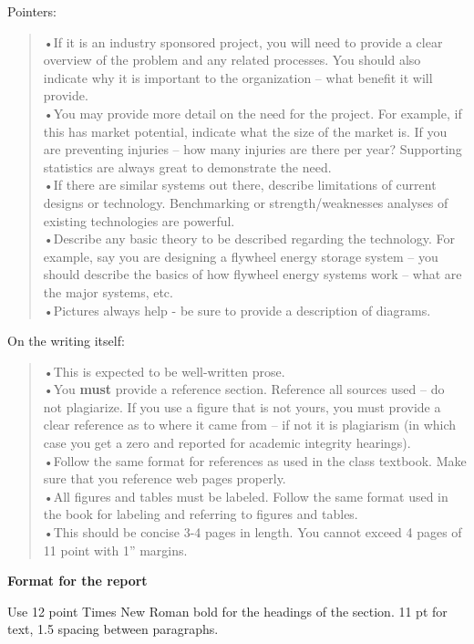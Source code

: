 \begin{enumerate}
\begin{onlysolution}
Pointers:
\begin{quote}
•If it is an industry sponsored project, you will need to provide a
clear overview of the problem and any related processes. You should also
indicate why it is important to the organization -- what benefit it will
provide.\\
•You may provide more detail on the need for the project. For example,
if this has market potential, indicate what the size of the market is.
If you are preventing injuries -- how many injuries are there per year?
Supporting statistics are always great to demonstrate the need.\\
•If there are similar systems out there, describe limitations of current
designs or technology. Benchmarking or strength/weaknesses analyses of existing
technologies are powerful.\\
•Describe any basic theory to be described regarding the technology. For
example, say you are designing a flywheel energy storage system -- you
should describe the basics of how flywheel energy systems work -- what
are the major systems, etc.\\
•Pictures always help - be sure to provide a description of diagrams.
\end{quote}

On the writing itself:
\begin{quote}
•This is expected to be well-written prose.\\
•You \textbf{must} provide a reference section. Reference all sources
used -- do not plagiarize. If you use a figure that is not yours, you
must provide a clear reference as to where it came from -- if not it is
plagiarism (in which case you get a zero and reported for academic
integrity hearings).\\
•Follow the same format for references as used in the class textbook.
Make sure that you reference web pages properly.\\
•All figures and tables must be labeled. Follow the same format used in
the book for labeling and referring to figures and tables.\\
•This should be concise 3-4 pages in length. You cannot exceed 4 pages
of 11 point with 1'' margins.\\
\end{quote}

\begin{center}
\textbf{Format for the report}
\end{center}

Use 12 point Times New Roman bold for the headings of the section. 11 pt
for text, 1.5 spacing between paragraphs.


\end{onlysolution}
\end{enumerate}

